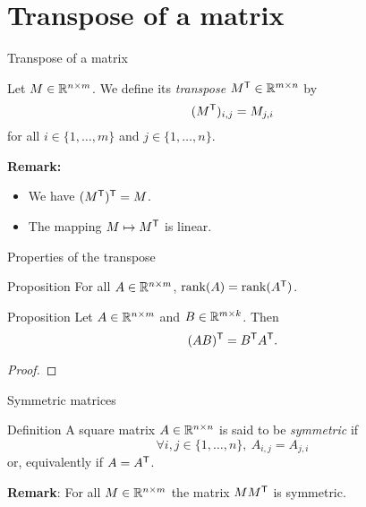 \documentclass{beamer}
\begin{document}
\section{Transpose of a matrix}

\begin{frame}[t]{Transpose of a matrix}
	\grid

	\vspace{-0.4cm}
	\begin{definition}
		Let $M \in \mathbb{R}^{n \times m}$. We define its \emph{transpose} $M^{{\sf T}} \in \mathbb{R}^{m \times n}$ by
		$$
		(M^{{\sf T}})_{i,j} = M_{j,i}
		$$
		for all $i \in \{1, \dots, m\}$ and $j \in \{1, \dots, n\}$.
	\end{definition}

	\vspace{3cm}
	\textbf{Remark:}
	\begin{itemize}
		\item We have $(M^{{\sf T}})^{{\sf T}} = M$. 
		\item The mapping $M \mapsto M^{{\sf T}}$ is linear.
	\end{itemize}
\end{frame}


\begin{frame}[t]{Properties of the transpose}
	\grid

	\vspace{-0.4cm}
	\begin{block}{Proposition}
		For all $A \in \mathbb{R}^{n \times m}$, \quad
		${{\rm rank}}(A) = {{\rm rank}}(A^{{\sf T}})$.
	\end{block}

	\begin{block}{Proposition}
		Let $A \in \mathbb{R}^{n \times m}$ and $B \in \mathbb{R}^{m \times k}$. Then
		\vspace{-0.3cm}
		$$
		(AB)^{\sT} = B^{\sT} A^{\sT}.
		\vspace{-0.3cm}
		$$
	\end{block}
	\begin{proof}
		\vspace{2.5cm}
		\vfill
	\end{proof}
\end{frame}

\begin{frame}[t]{Symmetric matrices}
	\grid

	\vspace{-0.4cm}
	\begin{block}{Definition}
	A square matrix $A \in \mathbb{R}^{n \times n}$ is said to be \emph{symmetric} if
	$$
	\forall i,j \in \{1, \dots, n\}, \ A_{i,j} = A_{j,i}
	$$
	or, equivalently if $A = A^{{\sf T}}$.
	\end{block}

	\textbf{Remark}: For all $M \in \mathbb{R}^{n \times m}$ the matrix $M M^{{\sf T}}$ is symmetric.
\end{frame}
\end{document}
